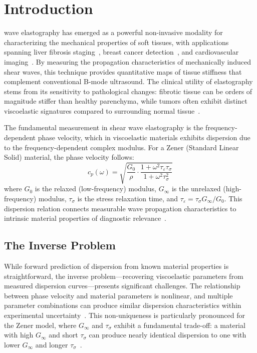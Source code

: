 \documentclass[journal]{IEEEtran}
\begin{document}
\section{Introduction}
 wave elastography has emerged as a powerful non-invasive modality for characterizing the mechanical properties of soft tissues, with applications spanning liver fibrosis staging~\cite{bamber2013}, breast cancer detection~\cite{alam2006}, and cardiovascular imaging~\cite{couade2011}. By measuring the propagation characteristics of mechanically induced shear waves, this technique provides quantitative maps of tissue stiffness that complement conventional B-mode ultrasound. The clinical utility of elastography stems from its sensitivity to pathological changes: fibrotic tissue can be orders of magnitude stiffer than healthy parenchyma, while tumors often exhibit distinct viscoelastic signatures compared to surrounding normal tissue~\cite{deffieux2009a}.

The fundamental measurement in shear wave elastography is the frequency-dependent phase velocity, which in viscoelastic materials exhibits dispersion due to the frequency-dependent complex modulus. For a Zener (Standard Linear Solid) material, the phase velocity follows:
\begin{equation}
c_p(\omega) = \sqrt{\frac{G_0}{\rho} \cdot \frac{1 + \omega^2\tau_\varepsilon\tau_\sigma}{1 + \omega^2\tau_\sigma^2}}
\end{equation}
where $G_0$ is the relaxed (low-frequency) modulus, $G_\infty$ is the unrelaxed (high-frequency) modulus, $\tau_\sigma$ is the stress relaxation time, and $\tau_\varepsilon = \tau_\sigma G_\infty/G_0$. This dispersion relation connects measurable wave propagation characteristics to intrinsic material properties of diagnostic relevance~\cite{muthupillai1995}.

\subsection{The Inverse Problem}

While forward prediction of dispersion from known material properties is straightforward, the inverse problem---recovering viscoelastic parameters from measured dispersion curves---presents significant challenges. The relationship between phase velocity and material parameters is nonlinear, and multiple parameter combinations can produce similar dispersion characteristics within experimental uncertainty~\cite{papazoglou2005}. This non-uniqueness is particularly pronounced for the Zener model, where $G_\infty$ and $\tau_\sigma$ exhibit a fundamental trade-off: a material with high $G_\infty$ and short $\tau_\sigma$ can produce nearly identical dispersion to one with lower $G_\infty$ and longer $\tau_\sigma$~\cite{catheline2004}.
\end{document}
